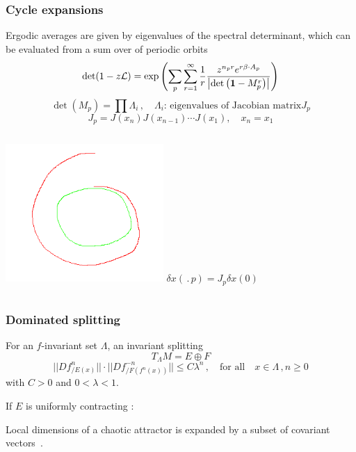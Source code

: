 \documentclass[mathserif, handout]{beamer}
\begin{document}
\begin{frame}
  \frametitle{Cycle expansions}
  {\color{cyan} Ergodic averages} are given by eigenvalues of
  the spectral determinant, which can be evaluated
  from a sum over of periodic orbits~\cite{DasBuch}
  \[
  \det(1-z{\cal L}) =  \exp \left(
    \sum_{p} \sum_{r=1}^\infty \frac{1}{r}
    \frac{  z^{{n_{p}} r }  e^{r \beta \cdot  A_{p}} }{\left|\det\left({\bf 1}-M_p^{r}\right)\right|}
  \right)
  \]
\[
\det (M_p) = \prod \Lambda_i \,,\quad \Lambda_i
    \mbox{: eigenvalues of Jacobian matrix} J_p
\]
  \[
  J_p = J(x_n)J(x_{n-1})\cdots J(x_1), \quad x_n =x_1
  \]

  \begin{columns}[c]
    \includegraphics[width=0.5\textwidth]{./figs/p1}
    $\delta x(\period{p}) = J_p\delta x(0) $
  \end{columns}

\end{frame}

\begin{frame}
  \frametitle{Dominated splitting}
  For an $f$-invariant set $\Lambda$, an invariant splitting
  \[
  T_\Lambda M = E \oplus F
  \]
  \[
  ||Df^{n}_{/E(x)}||\cdot||Df^{-n}_{/F(f^n(x))}|| \le C\lambda^n \,,\quad
  \text{for all} \quad x\in\Lambda\,, n\ge 0
  \]
  with $C>0$ and $0<\lambda<1$.

  \vspace{1.5em}
  \pause

  If $E$ is {\color{green} uniformly contracting} :

  Local dimensions of a chaotic attractor is expanded by
  a {\color{red} subset of covariant vectors}~\cite{ginelli-2007-99}.

\end{frame}
\end{document}
